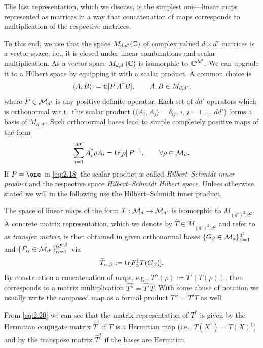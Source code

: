 \documentclass[11pt,a4paper]{article}
\numberwithin{equation}{section}
\theoremstyle{plain}
\theoremstyle{definition}
\begin{document}
The last representation, which we discuss, is the simplest one---linear maps
represented as matrices in a way that concatenation of maps corresponds to
multiplication of the respective matrices.

To this end, we use that the space $M_{d,d'}(\mathbb{C})$ of complex valued $d\times d'$
matrices is a vector space, i.e., it is closed under linear combinations and scalar
multiplication. As a vector space $M_{d,d'}(\mathbb{C})$ is isomorphic to $\mathbb{C}^{dd'}$. We
can upgrade it to a Hilbert space by equipping it with a scalar product. A common
choice is
\begin{equation}\label{eq:2.18}
    \langle A,B\rangle := \operatorname{tr}\![P\,A^\dagger B], \qquad A,B \in M_{d,d'},
\end{equation}
where $P\in \mathcal{M}_{d'}$ is any positive definite operator. Each set of $dd'$
operators which is orthonormal w.r.t.\ this scalar product
($\langle A_i,A_j\rangle=\delta_{ij}$, $i,j=1,\dots,dd'$) forms a basis of
$M_{d,d'}$. Such orthonormal bases lead to simple completely positive maps of the
form
\begin{equation}\label{eq:2.19}
    \sum_{i=1}^{dd'} A_i^\dagger \rho A_i = \operatorname{tr}[\rho]\,P^{-1}, \qquad \forall \rho \in \mathcal{M}_d.
\end{equation}
If $P=\one$ in \eqref{eq:2.18} the scalar product is called \emph{Hilbert--Schmidt
    inner product} and the respective space \emph{Hilbert--Schmidt Hilbert space}. Unless
otherwise stated we will in the following use the Hilbert--Schmidt inner product.

The space of linear maps of the form $T:\mathcal{M}_d \to \mathcal{M}_{d'}$ is isomorphic to
$M_{(d')^2,d^2}$. A concrete matrix representation, which we denote by
$\widehat{T}\in M_{(d')^2,d^2}$ and refer to as \emph{transfer matrix}, is then
obtained in given orthonormal bases $\{G_\beta \in \mathcal{M}_d\}_{\beta=1}^{d^2}$ and
$\{F_\alpha \in \mathcal{M}_{d'}\}_{\alpha=1}^{(d')^2}$ via
\begin{equation}\label{eq:2.20}
    \widehat{T}_{\alpha,\beta} := \operatorname{tr}\![F_\alpha^\dagger T(G_\beta)].
\end{equation}
By construction a concatenation of maps, e.g.,
$T''(\rho):=T'(T(\rho))$, then corresponds to a matrix multiplication
$\widehat{T''}=\widehat{T'} \widehat{T}$. With some abuse of notation we usually
write the composed map as a formal product $T'' = T' T$ as well.

From \eqref{eq:2.20} we can see that the matrix representation of $T^*$ is given
by the Hermitian conjugate matrix $\widehat{T}^\dagger$ if $T$ is a Hermitian map
(i.e., $T(X^\dagger)=T(X)^\dagger$) and by the transpose matrix $\widehat{T}^{T}$
if the bases are Hermitian.
\end{document}
